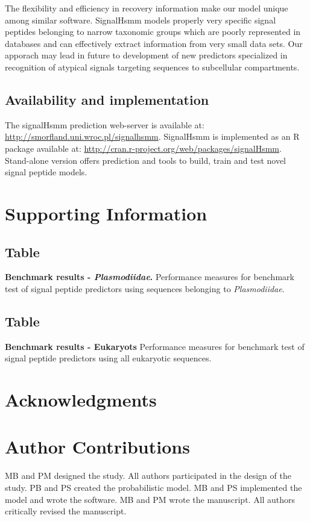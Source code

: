 \documentclass[10pt,letterpaper]{article}
\newcommand{\beginsupplement}{%
        \setcounter{subsection}{0}
        \renewcommand{\thesubsection}{S\arabic{subsection}}
     }
\begin{document}
The flexibility and efficiency in recovery information make our model unique among similar software. SignalHsmm models properly very specific signal peptides belonging to narrow taxonomic groups which are poorly represented in databases and can effectively extract information from very small data sets. Our apporach may lead in future to development of new predictors specialized in recognition of atypical signals targeting sequences to subcellular compartments.


\subsection*{Availability and implementation}
The signalHsmm prediction web-server is available at: \url{http://smorfland.uni.wroc.pl/signalhsmm}. SignalHsmm is implemented as an R package available at: \url{http://cran.r-project.org/web/packages/signalHsmm}. Stand-alone version offers prediction and tools to build, train and test novel signal peptide models.

\section*{Supporting Information}

\beginsupplement
\subsection{Table}
\label{tab:bench2010plas_full}
{\bf Benchmark results - \textit{Plasmodiidae}.} Performance measures for benchmark test of signal peptide predictors using sequences belonging to \textit{Plasmodiidae}.

\subsection{Table}
\label{tab:bench2010_full}
{\bf Benchmark results - Eukaryots} Performance measures for benchmark test of signal peptide predictors using all eukaryotic sequences.


\section*{Acknowledgments}

\section*{Author Contributions}
MB and PM designed the study. All authors participated in the design of the study. PB and PS created the probabilistic model. MB and PS implemented the model and wrote the software. MB and PM wrote the manuscript. All authors critically revised the manuscript.
\end{document}
